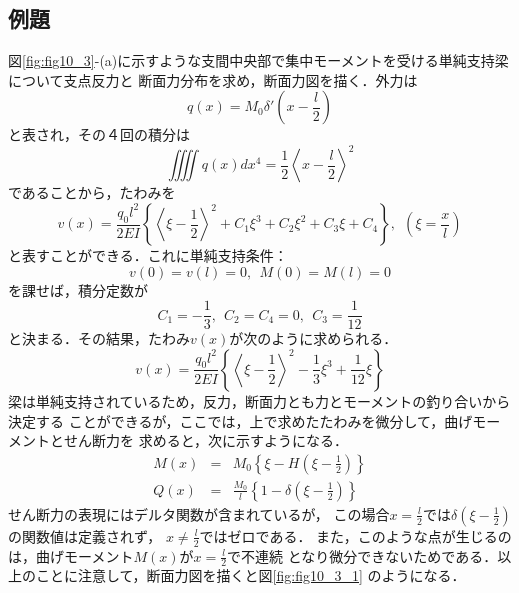 \documentclass[10pt,a4j]{jbook}
\begin{document}
\subsection{例題}
図\ref{fig:fig10_3}-(a)に示すような支間中央部で集中モーメントを受ける単純支持梁について支点反力と
断面力分布を求め，断面力図を描く．外力は
\begin{equation}
	q(x)=M_0\delta'\left(x-\frac{l}{2}\right)
\end{equation}
と表され，その４回の積分は
\begin{equation}
	\iiiint q(x)dx^4 =\frac{1}{2}\left< x-\frac{l}{2}\right>^2
\end{equation}
であることから，たわみを
\begin{equation}
	v(x)=\frac{q_0l^2}{2EI}\left\{ \left< \xi -\frac{1}{2} \right>^2+C_1\xi^3 +C_2\xi^2+C_3\xi+C_4\right\}, \ \ 
	\left(\xi=\frac{x}{l}\right)
\end{equation}
と表すことができる．これに単純支持条件：
\begin{equation}
	v(0)=v(l)=0, \ \ M(0)=M(l)=0
\end{equation}
を課せば，積分定数が
\begin{equation}
	C_1=-\frac{1}{3}, \ \ C_2=C_4=0, \ \ C_3=\frac{1}{12}
\end{equation}
と決まる．その結果，たわみ$v(x)$が次のように求められる．
\begin{equation}
	v(x)=\frac{q_0l^2}{2EI}\left\{ \left< \xi -\frac{1}{2} \right>^2-\frac{1}{3}\xi^3 +\frac{1}{12}\xi \right\}
\end{equation}
梁は単純支持されているため，反力，断面力とも力とモーメントの釣り合いから決定する
ことができるが，ここでは，上で求めたたわみを微分して，曲げモーメントとせん断力を
求めると，次に示すようになる．
\begin{eqnarray}
	M(x) &= & 
		M_0\left\{ \xi -H \left(\xi-\frac{1}{2}\right) \right\} \\
	Q(x) &= & 
		\frac{M_0}{l}\left\{1 -\delta\left(\xi-\frac{1}{2}\right)  \right\}
\end{eqnarray}
せん断力の表現にはデルタ関数が含まれているが，
この場合$x=\frac{l}{2}$では$\delta\left( \xi-\frac{1}{2}\right)$の関数値は定義されず，
$x\neq \frac{l}{2}$ではゼロである．
また，このような点が生じるのは，曲げモーメント$M(x)$が$x=\frac{l}{2}$で不連続
となり微分できないためである．以上のことに注意して，断面力図を描くと図\ref{fig:fig10_3_1}
のようになる．
\end{document}
